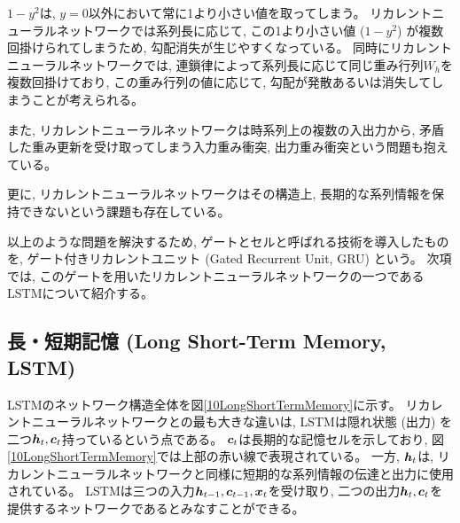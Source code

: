$1-y^2$は, $y=0$以外において常に1より小さい値を取ってしまう。
リカレントニューラルネットワークでは系列長に応じて, この1より小さい値 ($1-y^2$) が複数回掛けられてしまうため, 勾配消失が生じやすくなっている。
同時にリカレントニューラルネットワークでは, 連鎖律によって系列長に応じて同じ重み行列$W_h$を複数回掛けており, この重み行列の値に応じて, 勾配が発散あるいは消失してしまうことが考えられる。

また, リカレントニューラルネットワークは時系列上の複数の入出力から, 矛盾した重み更新を受け取ってしまう入力重み衝突, 出力重み衝突という問題も抱えている。

更に, リカレントニューラルネットワークはその構造上, 長期的な系列情報を保持できないという課題も存在している。

以上のような問題を解決するため, ゲートとセルと呼ばれる技術を導入したものを, ゲート付きリカレントユニット (Gated Recurrent Unit, GRU\cite{GRU}) という。
次項では, このゲートを用いたリカレントニューラルネットワークの一つであるLSTMについて紹介する。


\subsection{長・短期記憶 (Long Short-Term Memory, LSTM)} \label{DL:RNN:LongShortTermMemory}

LSTMのネットワーク構造全体を図\ref{10LongShortTermMemory}に示す。
リカレントニューラルネットワークとの最も大きな違いは, LSTMは隠れ状態 (出力) を二つ${\mbox{\boldmath{$h$}}}_t,{\mbox{\boldmath{$c$}}}_t$持っているという点である。
${\mbox{\boldmath{$c$}}}_t$は長期的な記憶セルを示しており, 図\ref{10LongShortTermMemory}では上部の赤い線で表現されている。
一方, ${\mbox{\boldmath{$h$}}}_t$は, リカレントニューラルネットワークと同様に短期的な系列情報の伝達と出力に使用されている。
LSTMは三つの入力${\mbox{\boldmath{$h$}}}_{t-1},{\mbox{\boldmath{$c$}}}_{t-1},{\mbox{\boldmath{$x$}}}_t$を受け取り, 二つの出力${\mbox{\boldmath{$h$}}}_t,{\mbox{\boldmath{$c$}}}_t$を提供するネットワークであるとみなすことができる。

